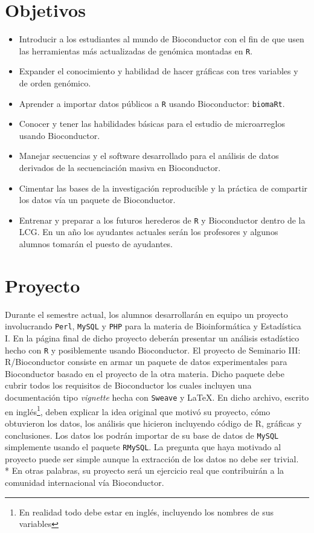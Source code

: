 \documentclass[letterpaper,12pt]{article}
\newcommand{\pl}[1]{\texttt{#1}}
\begin{document}
\section{Objetivos}
  \begin{itemize}
  \item Introducir a los estudiantes al mundo de Bioconductor con el fin de que usen las herramientas más actualizadas de genómica montadas en \pl{R}.
  \item Expander el conocimiento y habilidad de hacer gráficas con tres variables y de orden genómico.
  \item Aprender a importar datos públicos a \pl{R} usando Bioconductor: \pl{biomaRt}.
  \item Conocer y tener las habilidades básicas para el estudio de microarreglos usando Bioconductor.
  \item Manejar secuencias y el software desarrollado para el análisis de datos derivados de la secuenciación masiva en Bioconductor.
  \item Cimentar las bases de la investigación reproducible y la práctica de compartir los datos vía un paquete de Bioconductor.
  \item Entrenar y preparar a los futuros herederos de \pl{R} y Bioconductor dentro de la LCG. En un año los ayudantes actuales serán los profesores y algunos alumnos tomarán el puesto de ayudantes.
  \end{itemize}

\section{Proyecto}
Durante el semestre actual, los alumnos desarrollarán en equipo un proyecto involucrando \pl{Perl}, \pl{MySQL} y \pl{PHP} para la materia de Bioinformática y Estadística I. En la página final de dicho proyecto deberán presentar un análisis estadístico hecho con \pl{R} y posiblemente usando Bioconductor. El proyecto de Seminario III: R/Bioconductor consiste en armar un paquete de datos experimentales para Bioconductor basado en el proyecto de la otra materia. Dicho paquete debe cubrir todos los requisitos de Bioconductor los cuales incluyen una documentación tipo \emph{vignette} hecha con \pl{Sweave} y \LaTeX. En dicho archivo, escrito en inglés\footnote{En realidad todo debe estar en inglés, incluyendo los nombres de sus variables}, deben explicar la idea original que motivó su proyecto, cómo obtuvieron los datos, los análisis que hicieron incluyendo código de R, gráficas y conclusiones. Los datos los podrán importar de su base de datos de \pl{MySQL} simplemente usando el paquete \pl{RMySQL}. La pregunta que haya motivado al proyecto puede ser simple aunque la extracción de los datos no debe ser trivial.
\\* \indent En otras palabras, su proyecto será un ejercicio real que contribuirán a la comunidad internacional vía Bioconductor.
\end{document}

